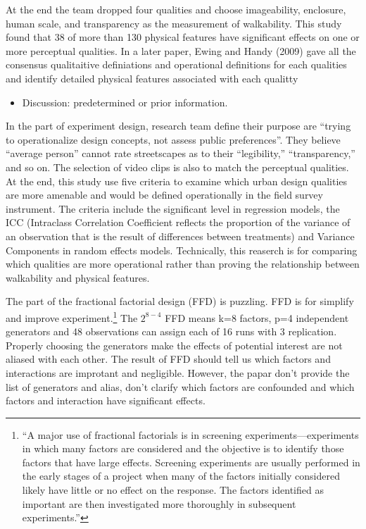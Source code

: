 \documentclass[12pt,]{article}
\providecommand{\tightlist}{%
  \setlength{\itemsep}{0pt}\setlength{\parskip}{0pt}}
\let\rmarkdownfootnote\footnote%
\def\footnote{\protect\rmarkdownfootnote}
\begin{document}
At the end the team dropped four qualities and choose imageability,
enclosure, human scale, and transparency as the measurement of
walkability. This study found that 38 of more than 130 physical features
have significant effects on one or more perceptual qualities. In a later
paper, Ewing and Handy (2009) gave all the consensus qualitaitive
definiations and operational definitions for each qualities and identify
detailed physical features associated with each qualitty

\begin{itemize}
\tightlist
\item
  Discussion: predetermined or prior information.
\end{itemize}

In the part of experiment design, research team define their purpose are
``trying to operationalize design concepts, not assess public
preferences''. They believe ``average person'' cannot rate streetscapes
as to their ``legibility,'' ``transparency,'' and so on. The selection
of video clips is also to match the perceptual qualities. At the end,
this study use five criteria to examine which urban design qualities are
more amenable and would be defined operationally in the field survey
instrument. The criteria include the significant level in regression
models, the ICC (Intraclass Correlation Coefficient reflects the
proportion of the variance of an observation that is the result of
differences between treatments) and Variance Components in random
effects models. Technically, this reaserch is for comparing which
qualities are more operational rather than proving the relationship
between walkability and physical features.

The part of the fractional factorial design (FFD) is puzzling. FFD is
for simplify and improve experiment.\footnote{``A major use of
  fractional factorials is in screening experiments---experiments in
  which many factors are considered and the objective is to identify
  those factors that have large effects. Screening experiments are
  usually performed in the early stages of a project when many of the
  factors initially considered likely have little or no effect on the
  response. The factors identified as important are then investigated
  more thoroughly in subsequent experiments.''} The \(2^{8-4}\) FFD
means k=8 factors, p=4 independent generators and 48 observations can
assign each of 16 runs with 3 replication. Properly choosing the
generators make the effects of potential interest are not aliased with
each other. The result of FFD should tell us which factors and
interactions are improtant and negligible. However, the papar don't
provide the list of generators and alias, don't clarify which factors
are confounded and which factors and interaction have significant
effects.
\end{document}
